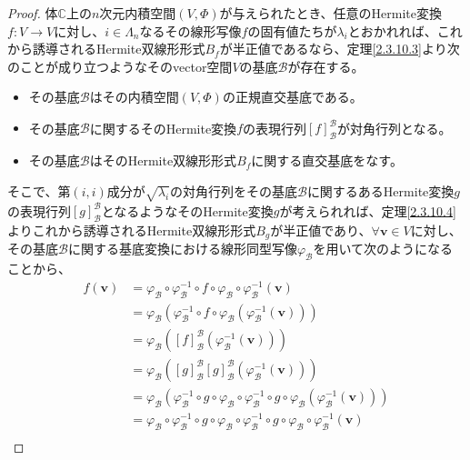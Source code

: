 \documentclass[dvipdfmx]{jsarticle}
\begin{document}
\begin{proof}
体$\mathbb{C}$上の$n$次元内積空間$(V,\varPhi)$が与えられたとき、任意のHermite変換$f:V \rightarrow V$に対し、$i \in \varLambda_{n}$なるその線形写像$f$の固有値たちが$\lambda_{i}$とおかれれば、これから誘導されるHermite双線形形式$B_{f}$が半正値であるなら、定理\ref{2.3.10.3}より次のことが成り立つようなそのvector空間$V$の基底$\mathcal{B}$が存在する。
\begin{itemize}
\item
  その基底$\mathcal{B}$はその内積空間$(V,\varPhi)$の正規直交基底である。
\item
  その基底$\mathcal{B}$に関するそのHermite変換$f$の表現行列$[ f]_{\mathcal{B}}^{\mathcal{B}}$が対角行列となる。
\item
  その基底$\mathcal{B}$はそのHermite双線形形式$B_{f}$に関する直交基底をなす。
\end{itemize}
そこで、第$(i,i)$成分が$\sqrt{\lambda_{i}}$の対角行列をその基底$\mathcal{B}$に関するあるHermite変換$g$の表現行列$[ g]_{\mathcal{B}}^{\mathcal{B}}$となるようなそのHermite変換$g$が考えられれば、定理\ref{2.3.10.4}よりこれから誘導されるHermite双線形形式$B_{g}$が半正値であり、$\forall\mathbf{v} \in V$に対し、その基底$\mathcal{B}$に関する基底変換における線形同型写像$\varphi_{\mathcal{B}}$を用いて次のようになることから、
\begin{align*}
f\left( \mathbf{v} \right) &= \varphi_{\mathcal{B}} \circ \varphi_{\mathcal{B}}^{- 1} \circ f \circ \varphi_{\mathcal{B}} \circ \varphi_{\mathcal{B}}^{- 1}\left( \mathbf{v} \right)\\
&= \varphi_{\mathcal{B}}\left( \varphi_{\mathcal{B}}^{- 1} \circ f \circ \varphi_{\mathcal{B}}\left( \varphi_{\mathcal{B}}^{- 1}\left( \mathbf{v} \right) \right) \right)\\
&= \varphi_{\mathcal{B}}\left( [ f]_{\mathcal{B}}^{\mathcal{B}}\left( \varphi_{\mathcal{B}}^{- 1}\left( \mathbf{v} \right) \right) \right)\\
&= \varphi_{\mathcal{B}}\left( [ g]_{\mathcal{B}}^{\mathcal{B}}[ g]_{\mathcal{B}}^{\mathcal{B}}\left( \varphi_{\mathcal{B}}^{- 1}\left( \mathbf{v} \right) \right) \right)\\
&= \varphi_{\mathcal{B}}\left( \varphi_{\mathcal{B}}^{- 1} \circ g \circ \varphi_{\mathcal{B}} \circ \varphi_{\mathcal{B}}^{- 1} \circ g \circ \varphi_{\mathcal{B}}\left( \varphi_{\mathcal{B}}^{- 1}\left( \mathbf{v} \right) \right) \right)\\
&= \varphi_{\mathcal{B}} \circ \varphi_{\mathcal{B}}^{- 1} \circ g \circ \varphi_{\mathcal{B}} \circ \varphi_{\mathcal{B}}^{- 1} \circ g \circ \varphi_{\mathcal{B}} \circ \varphi_{\mathcal{B}}^{- 1}\left( \mathbf{v} \right)\\

\end{align*}
\end{proof}
\end{document}
